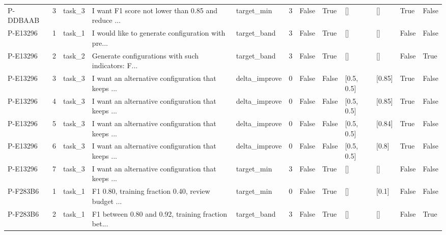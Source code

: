 \begin{tabular}{lrlllrllllll}
   P-DDBAAB &        3 & task\_3 & I want F1 score not lower than 0.85 and reduce ... &    target\_min &          3 &          False &                  True &               [] &             [] &               True &            False \\
   P-E13296 &        1 & task\_1 & I would like to generate configuration with pre... &   target\_band &          3 &          False &                  True &               [] &             [] &              False &            False \\
   P-E13296 &        2 & task\_2 & Generate configurations with such indicators: F... &   target\_band &          3 &          False &                  True &               [] &             [] &              False &             True \\
   P-E13296 &        3 & task\_3 & I want an alternative configuration that keeps ... & delta\_improve &          0 &          False &                 False &       [0.5, 0.5] &         [0.85] &               True &            False \\
   P-E13296 &        4 & task\_3 & I want an alternative configuration that keeps ... & delta\_improve &          0 &          False &                 False &       [0.5, 0.5] &         [0.85] &               True &            False \\
   P-E13296 &        5 & task\_3 & I want an alternative configuration that keeps ... & delta\_improve &          0 &          False &                 False &       [0.5, 0.5] &         [0.84] &               True &            False \\
   P-E13296 &        6 & task\_3 & I want an alternative configuration that keeps ... & delta\_improve &          0 &          False &                 False &       [0.5, 0.5] &          [0.8] &               True &            False \\
   P-E13296 &        7 & task\_3 & I want an alternative configuration that keeps ... &    target\_min &          3 &          False &                  True &               [] &             [] &              False &            False \\
   P-F283B6 &        1 & task\_1 & F1 0.80, training fraction 0.40, review budget ... &    target\_min &          0 &          False &                  True &               [] &          [0.1] &              False &            False \\
   P-F283B6 &        2 & task\_1 & F1 between 0.80 and 0.92, training fraction bet... &   target\_band &          3 &          False &                  True &               [] &             [] &              False &             True \\

\end{tabular}
